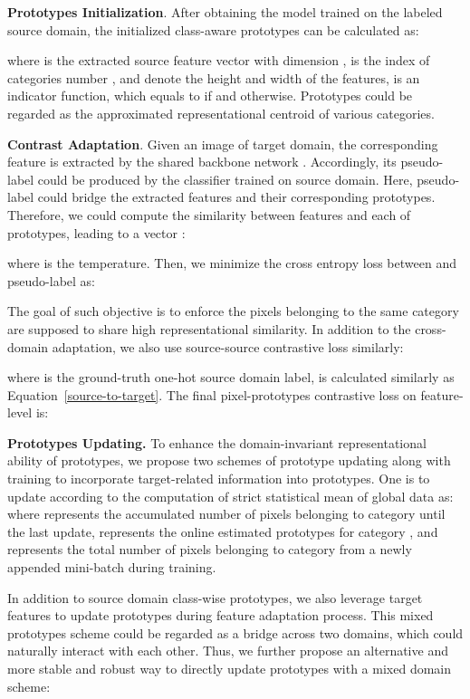 \documentclass[runningheads]{llncs}
\begin{document}
\noindent \textbf{Prototypes Initialization}. After obtaining the model trained on the labeled source domain, the initialized class-aware prototypes can be calculated as:


where  is the extracted source feature vector with dimension ,  is the index of categories number ,  and  denote the height and width of the features,  is an indicator function, which equals to  if  and  otherwise. Prototypes could be regarded as the approximated representational centroid of various categories. 



\noindent \textbf{Contrast Adaptation}. Given an image of target domain, the corresponding feature  is extracted by the shared backbone network . Accordingly, its pseudo-label  could be produced by the classifier  trained on source domain. Here, pseudo-label could bridge the extracted features and their corresponding prototypes. Therefore, we could compute the similarity between features and each of prototypes, leading to a vector :

where  is the temperature. 
Then, we minimize the cross entropy loss between  and pseudo-label  as:

The goal of such objective is to enforce the pixels belonging to the same category are supposed to share high representational similarity. 
In addition to the cross-domain adaptation, we also use source-source contrastive loss  similarly:

where  is the ground-truth one-hot source domain label,  is calculated similarly as Equation~\ref{source-to-target}. The final pixel-prototypes contrastive loss on feature-level is:





\noindent \textbf{Prototypes Updating.} To enhance the domain-invariant representational ability of prototypes, we propose two schemes of prototype updating along with training to incorporate target-related information into prototypes. One is to update according to the computation of strict statistical mean of global data as:
where  represents the accumulated number of pixels belonging to category  until the last update,   represents the online estimated prototypes for category , and  represents the total number of pixels belonging to category  from a newly appended mini-batch during training.

In addition to source domain class-wise prototypes, we also leverage target features to update prototypes during feature adaptation process. This mixed prototypes scheme could be regarded as a bridge across two domains, which could naturally interact with each other. Thus, we further propose an alternative and more stable and robust way to directly update prototypes with a mixed domain scheme:
\end{document}
